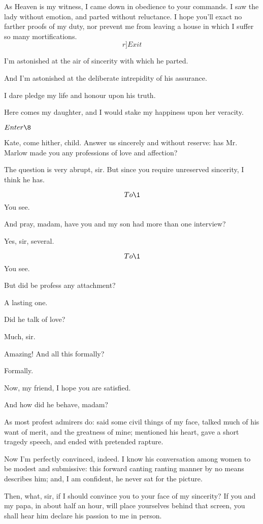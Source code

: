 \documentclass{book}
\begin{document}
\2  As Heaven is my witness, I came down in obedience to your
commands.  I saw the lady without emotion, and parted without
reluctance.  I hope you'll exact no farther proofs of my duty, nor
prevent me from leaving a house in which I suffer so many
mortifications.  \[r]Exit\]

\1  I'm astonished at the air of sincerity with which he
parted.

\3  And I'm astonished at the deliberate intrepidity of his
assurance.

\1  I dare pledge my life and honour upon his truth.

\3  Here comes my daughter, and I would stake my happiness
upon her veracity.


\(Enter \8\)


\3  Kate, come hither, child.  Answer us sincerely and
without reserve: has Mr. Marlow made you any professions of love and
affection?

\8  The question is very abrupt, sir.  But since you
require unreserved sincerity, I think he has.

\3  \[To \1\]  You see.

\1  And pray, madam, have you and my son had more than one
interview?

\8  Yes, sir, several.

\3  \[To \1\]  You see.

\1  But did be profess any attachment?

\8  A lasting one.

\1  Did he talk of love?

\8  Much, sir.

\1  Amazing!  And all this formally?

\8  Formally.

\3  Now, my friend, I hope you are satisfied.

\1  And how did he behave, madam?

\8  As most profest admirers do: said some civil things
of my face, talked much of his want of merit, and the greatness of
mine; mentioned his heart, gave a short tragedy speech, and ended with
pretended rapture.

\1  Now I'm perfectly convinced, indeed.  I know his
conversation among women to be modest and submissive: this forward
canting ranting manner by no means describes him; and, I am confident,
he never sat for the picture.

\8  Then, what, sir, if I should convince you to your
face of my sincerity?  If you and my papa, in about half an hour, will
place yourselves behind that screen, you shall hear him declare his
passion to me in person.
\end{document}
